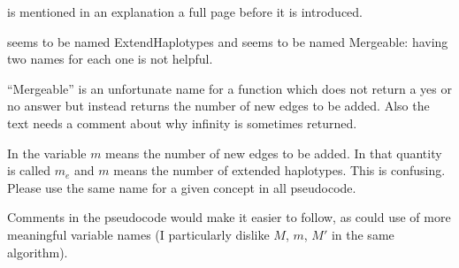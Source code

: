 \begin{point}{} %
 is mentioned in an explanation a full page before it
is introduced.
\end{point}


\begin{point}{} %
 seems to be named ExtendHaplotypes and  seems
to be named Mergeable: having two names for each one is not helpful.
\end{point}


\begin{point}{} %
``Mergeable'' is an unfortunate name for a function which does not
return a yes or no answer but instead returns the number of
new edges to be added. Also the text needs a comment about why
infinity is sometimes returned.
\end{point}


\begin{point}{} %
In  the variable $m$ means the number of new edges to be
added. In  that quantity is called $m_e$ and $m$ means the
number of extended haplotypes. This is confusing. Please use the
same name for a given concept in all pseudocode.
\end{point}


\begin{point}{} %
Comments in the pseudocode would make it easier to follow, as could
use of more meaningful variable names (I particularly dislike $M$, $m$, $M'$
in the same algorithm).
\end{point}

